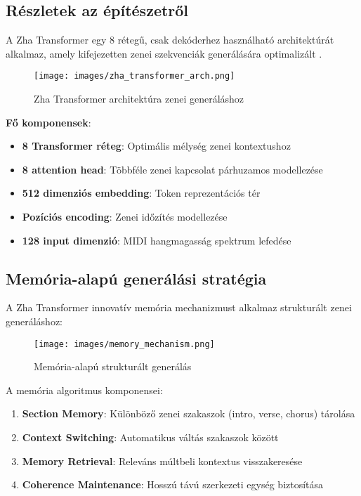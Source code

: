 \subsection{Részletek az építészetről}
A Zha Transformer egy 8 rétegű, csak dekóderhez használható architektúrát alkalmaz, amely kifejezetten zenei szekvenciák generálására optimalizált \cite{huang2018music}.

\begin{figure}[h]
\centering
\texttt{[image: images/zha\_transformer\_arch.png]}
\caption{Zha Transformer architektúra zenei generáláshoz}
\label{fig:zha_transformer}
\end{figure}

\textbf{Fő komponensek}:
\begin{itemize}
\item \textbf{8 Transformer réteg}: Optimális mélység zenei kontextushoz
\item \textbf{8 attention head}: Többféle zenei kapcsolat párhuzamos modellezése
\item \textbf{512 dimenziós embedding}: Token reprezentációs tér
\item \textbf{Pozíciós encoding}: Zenei időzítés modellezése
\item \textbf{128 input dimenzió}: MIDI hangmagasság spektrum lefedése
\end{itemize}

\subsection{Memória-alapú generálási stratégia}
A Zha Transformer innovatív memória mechanizmust alkalmaz strukturált zenei generáláshoz:

\begin{figure}[h]
\centering
\texttt{[image: images/memory\_mechanism.png]}
\caption{Memória-alapú strukturált generálás}
\label{fig:memory_mechanism}
\end{figure}

A memória algoritmus komponensei:
\begin{enumerate}
\item \textbf{Section Memory}: Különböző zenei szakaszok (intro, verse, chorus) tárolása
\item \textbf{Context Switching}: Automatikus váltás szakaszok között
\item \textbf{Memory Retrieval}: Releváns múltbeli kontextus visszakeresése
\item \textbf{Coherence Maintenance}: Hosszú távú szerkezeti egység biztosítása
\end{enumerate}

